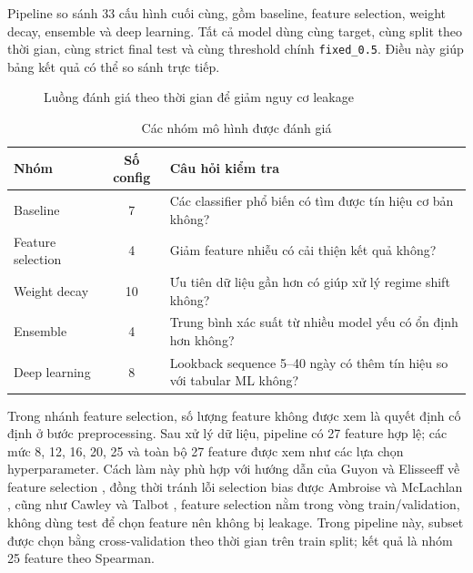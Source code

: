 \documentclass[10pt,a4paper]{article}
\newcommand{\code}[1]{\texttt{#1}}
\begin{document}
Pipeline so sánh 33 cấu hình cuối cùng, gồm baseline, feature selection, weight decay, ensemble và deep learning. Tất cả model dùng cùng target, cùng split theo thời gian, cùng strict final test và cùng threshold chính \code{fixed\_0.5}. Điều này giúp bảng kết quả có thể so sánh trực tiếp.

\begin{figure}[!htbp]
\centering
{}
\caption{Luồng đánh giá theo thời gian để giảm nguy cơ leakage}
\end{figure}

\begin{table}[!htbp]
\centering
\caption{Các nhóm mô hình được đánh giá}
\small
\begin{tabularx}{0.98\linewidth}{lcY}
\toprule
\textbf{Nhóm} & \textbf{Số config} & \textbf{Câu hỏi kiểm tra} \\
\midrule
Baseline & 7 & Các classifier phổ biến có tìm được tín hiệu cơ bản không? \\
Feature selection & 4 & Giảm feature nhiễu có cải thiện kết quả không? \\
Weight decay & 10 & Ưu tiên dữ liệu gần hơn có giúp xử lý regime shift không? \\
Ensemble & 4 & Trung bình xác suất từ nhiều model yếu có ổn định hơn không? \\
Deep learning & 8 & Lookback sequence 5--40 ngày có thêm tín hiệu so với tabular ML không? \\
\bottomrule
\end{tabularx}
\end{table}

Trong nhánh feature selection, số lượng feature không được xem là quyết định cố định ở bước preprocessing. Sau xử lý dữ liệu, pipeline có 27 feature hợp lệ; các mức 8, 12, 16, 20, 25 và toàn bộ 27 feature được xem như các lựa chọn hyperparameter. Cách làm này phù hợp với hướng dẫn của Guyon và Elisseeff về feature selection \cite{guyon2003}, đồng thời tránh lỗi selection bias được Ambroise và McLachlan \cite{ambroise2002}, cũng như Cawley và Talbot \cite{cawley2010},  feature selection nằm trong vòng train/validation, không dùng test để chọn feature nên không bị leakage. Trong pipeline này, subset được chọn bằng cross-validation theo thời gian trên train split; kết quả là nhóm 25 feature theo Spearman.
\end{document}
